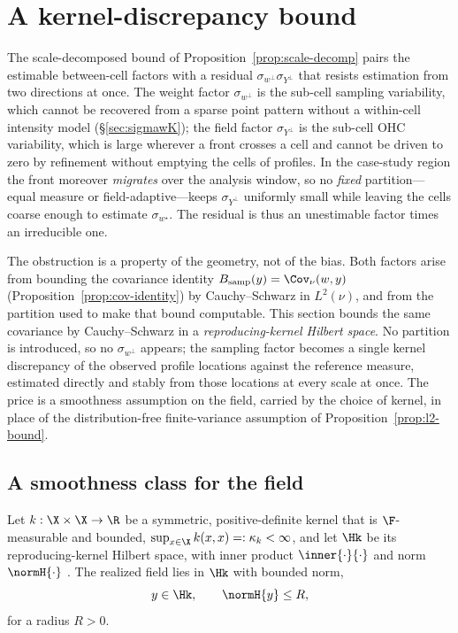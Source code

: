 \section{A kernel-discrepancy bound}
\label{sec:rkhs}

The scale-decomposed bound of Proposition~\ref{prop:scale-decomp} pairs the
estimable between-cell factors with a residual
$\sigma_{w^{\perp}}\sigma_{Y^{\perp}}$ that resists estimation from two
directions at once. The weight factor $\sigma_{w^{\perp}}$ is the sub-cell
sampling variability, which cannot be recovered from a sparse point pattern
without a within-cell intensity model (\S\ref{sec:sigmawK}); the field factor
$\sigma_{Y^{\perp}}$ is the sub-cell OHC variability, which is large wherever a
front crosses a cell and cannot be driven to zero by refinement without
emptying the cells of profiles. In the case-study region the front moreover
\emph{migrates} over the analysis window, so no \emph{fixed} partition---equal
measure or field-adaptive---keeps $\sigma_{Y^{\perp}}$ uniformly small while
leaving the cells coarse enough to estimate $\sigma_{w^{\star}}$. The residual
is thus an unestimable factor times an irreducible one.

The obstruction is a property of the geometry, not of the bias. Both factors
arise from bounding the covariance identity
$B_{\mathrm{samp}}(y)=\Cov_\nu(w,y)$ (Proposition~\ref{prop:cov-identity}) by
Cauchy--Schwarz in $L^2(\nu)$, and from the partition used to make that bound
computable. This section bounds the same covariance by Cauchy--Schwarz in a
\emph{reproducing-kernel Hilbert space}. No partition is introduced, so no
$\sigma_{w^{\perp}}$ appears; the sampling factor becomes a single kernel
discrepancy of the observed profile locations against the reference measure,
estimated directly and stably from those locations at every scale at once. The
price is a smoothness assumption on the field, carried by the choice of kernel,
in place of the distribution-free finite-variance assumption of
Proposition~\ref{prop:l2-bound}.

\subsection{A smoothness class for the field}
\label{sec:rkhs-class}

\begin{assumption}
\label{ass:rkhs}
Let $k:\X\times\X\to\R$ be a symmetric, positive-definite kernel that is
$\F$-measurable and bounded, $\sup_{x\in\X}k(x,x)=:\kappa_k<\infty$, and let
$\Hk$ be its reproducing-kernel Hilbert space, with inner product
$\inner{\cdot}{\cdot}$ and norm $\normH{\cdot}$
\citep{berlinet2004}. The realized field lies in $\Hk$ with bounded norm,
\[
  y\in\Hk,\qquad \normH{y}\le R ,
\]
for a radius $R>0$.
\end{assumption}

